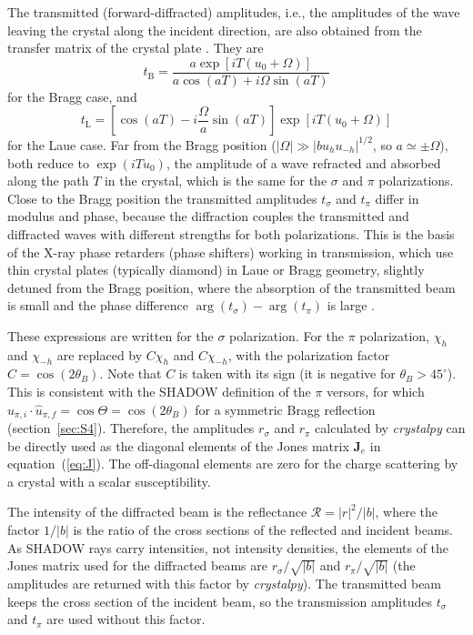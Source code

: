 \documentclass{iucr}
\begin{document}
The transmitted (forward-diffracted) amplitudes, i.e., the amplitudes of the wave leaving the crystal along the incident direction, are also obtained from the transfer matrix of the crystal plate \cite{Guigay2024}. They are
\begin{equation}\label{eq:tbragg}
t_{\mathrm{B}} = \frac{a \exp[iT(u_0+\Omega)]}{a\cos(aT)+i\Omega\sin(aT)}
\end{equation}
for the Bragg case, and
\begin{equation}\label{eq:tlaue}
t_{\mathrm{L}} = \left[\cos(aT) - i\frac{\Omega}{a}\sin(aT)\right] \exp[iT(u_0+\Omega)]
\end{equation}
for the Laue case. Far from the Bragg position ($|\Omega|\gg|bu_hu_{-h}|^{1/2}$, so $a\simeq\pm\Omega$), both reduce to $\exp(iTu_0)$, the amplitude of a wave refracted and absorbed along the path $T$ in the crystal, which is the same for the $\sigma$ and $\pi$ polarizations. Close to the Bragg position the transmitted amplitudes $t_\sigma$ and $t_\pi$ differ in modulus and phase, because the diffraction couples the transmitted and diffracted waves with different strengths for both polarizations. This is the basis of the X-ray phase retarders (phase shifters) working in transmission, which use thin crystal plates (typically diamond) in Laue or Bragg geometry, slightly detuned from the Bragg position, where the absorption of the transmitted beam is small and the phase difference $\arg(t_\sigma)-\arg(t_\pi)$ is large \cite{PolarizationDraft}.

These expressions are written for the $\sigma$ polarization. For the $\pi$ polarization, $\chi_h$ and $\chi_{-h}$ are replaced by $C\chi_h$ and $C\chi_{-h}$, with the polarization factor $C=\cos(2\theta_B)$. Note that $C$ is taken with its sign (it is negative for $\theta_B>45^\circ$). This is consistent with the SHADOW definition of the $\pi$ versors, for which $\hat{u}_{\pi,i}\cdot\hat{u}_{\pi,f}=\cos\Theta=\cos(2\theta_B)$ for a symmetric Bragg reflection (section~\ref{sec:S4}). Therefore, the amplitudes $r_\sigma$ and $r_\pi$ calculated by {\it crystalpy} can be directly used as the diagonal elements of the Jones matrix $\textbf{J}_e$ in equation~(\ref{eq:J}). The off-diagonal elements are zero for the charge scattering by a crystal with a scalar susceptibility.

The intensity of the diffracted beam is the reflectance $\mathcal{R}=|r|^2/|b|$, where the factor $1/|b|$ is the ratio of the cross sections of the reflected and incident beams. As SHADOW rays carry intensities, not intensity densities, the elements of the Jones matrix used for the diffracted beams are $r_\sigma/\sqrt{|b|}$ and $r_\pi/\sqrt{|b|}$ (the amplitudes are returned with this factor by {\it crystalpy}). The transmitted beam keeps the cross section of the incident beam, so the transmission amplitudes $t_\sigma$ and $t_\pi$ are used without this factor.
\end{document}
